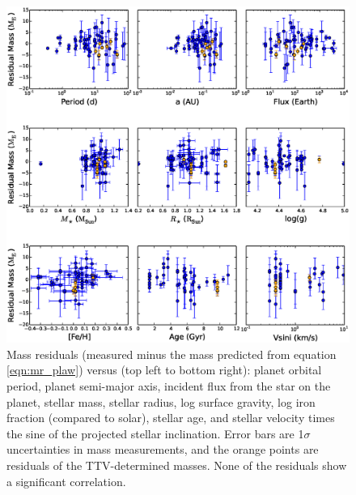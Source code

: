 \documentclass[iop]{emulateapj}
\begin{document}
\begin{figure}[htbp] %
   \centering
    \includegraphics[width=6in]{mr_resids.eps} 
   \caption{\small Mass residuals (measured minus the mass predicted from equation \ref{eqn:mr_plaw}) versus (top left to bottom right): planet orbital period, planet semi-major axis, incident flux from the star on the planet, stellar mass, stellar radius, log surface gravity, log iron fraction (compared to solar), stellar age, and stellar velocity times the sine of the projected stellar inclination. Error bars are 1$\sigma$ uncertainties in mass measurements, and the orange points are residuals of the TTV-determined masses.  None of the residuals show a significant correlation.}
   \label{fig:resids}
\end{figure}

\clearpage
\end{document}
